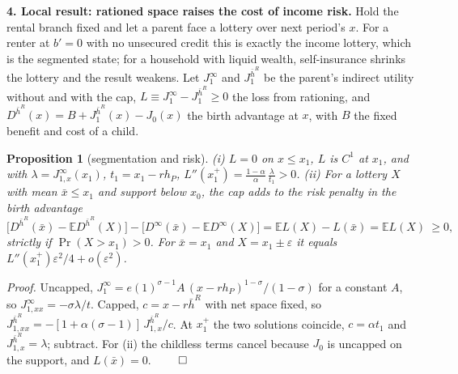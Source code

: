 \documentclass[10pt]{article}
\newtheorem{proposition}{Proposition}
\newcommand{\E}{\mathbb E}
\newcommand{\1}{\mathbf 1}
\newcommand{\hbR}{\bar h^{R}}
\begin{document}
\medskip
\textbf{4. Local result: rationed space raises the cost of income risk.}
Hold the rental branch fixed and let a parent face a lottery over next period's $x$. For a renter at $b'=0$ with no unsecured credit this is exactly the income lottery, which is the segmented state; for a household with liquid wealth, self-insurance shrinks the lottery and the result weakens. Let $J^{\infty}_1$ and $J^{\hbR}_1$ be the parent's indirect utility without and with the cap, $L\equiv J^{\infty}_1-J^{\hbR}_1\ge0$ the loss from rationing, and $D^{\hbR}(x)=B+J^{\hbR}_1(x)-J_0(x)$ the birth advantage at $x$, with $B$ the fixed benefit and cost of a child.
\begin{proposition}[segmentation and risk]
(i) $L=0$ on $x\le x_1$, $L$ is $C^{1}$ at $x_1$, and with $\lambda=J^{\infty}_{1,x}(x_1)$, $t_1=x_1-rh_P$,
$L''(x_1^{+})=\frac{1-\alpha}{\alpha}\,\frac{\lambda}{t_1}>0$.
(ii) For a lottery $X$ with mean $\bar x\le x_1$ and support below $x_0$, the cap adds to the risk penalty in the birth advantage
\[
\bigl[D^{\hbR}(\bar x)-\E D^{\hbR}(X)\bigr]-\bigl[D^{\infty}(\bar x)-\E D^{\infty}(X)\bigr]=\E L(X)-L(\bar x)=\E L(X)\ \ge 0,
\]
strictly if $\Pr(X>x_1)>0$. For $\bar x=x_1$ and $X=x_1\pm\varepsilon$ it equals $L''(x_1^{+})\varepsilon^{2}/4+o(\varepsilon^{2})$.
\end{proposition}
\emph{Proof.} Uncapped, $J^{\infty}_1=e(1)^{\sigma-1}A\,(x-rh_P)^{1-\sigma}/(1-\sigma)$ for a constant $A$, so $J^{\infty}_{1,xx}=-\sigma\lambda/t$. Capped, $c=x-r\hbR$ with net space fixed, so $J^{\hbR}_{1,xx}=-[1+\alpha(\sigma-1)]\,J^{\hbR}_{1,x}/c$. At $x_1^{+}$ the two solutions coincide, $c=\alpha t_1$ and $J^{\hbR}_{1,x}=\lambda$; subtract. For (ii) the childless terms cancel because $J_0$ is uncapped on the support, and $L(\bar x)=0$. $\qed$
\end{document}
